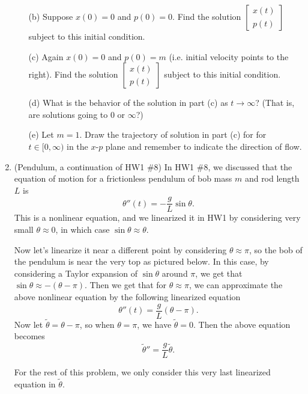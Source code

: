 \documentclass[11pt]{article}
\theoremstyle{definition}
\begin{document}
\begin{enumerate}[leftmargin=*]
\begin{itemize}
\item[(b)] Suppose $x(0)=0$ and $p(0)=0$.  Find the solution $\left[\begin{array}{l} x(t) \\ p(t) \end{array}\right]$ subject to this initial condition.\\

\item[(c)] Again $x(0)=0$ and $p(0)=m$ (i.e. initial velocity points to the right).  Find the solution $\left[\begin{array}{l} x(t) \\ p(t) \end{array}\right]$ subject to this initial condition.  

\item [(d)] What is the behavior of the solution in part (c) as $t\to \infty$?   (That is, are solutions  going to $0$ or $\infty$?)

\item [(e)] Let $m=1$.  Draw the trajectory of solution in part (c) for  for $t\in [0, \infty)$ in the $x$-$p$ plane and remember to indicate the direction of flow.  \\
\end{itemize}

\item (Pendulum, a continuation of HW1 \#8) In HW1 \#8, we discussed  that the equation of motion for a frictionless pendulum of bob mass $m$ and rod length $L$ is 
\[ 
\theta''(t) =-\frac{g}{L}\sin \theta.
\]
This is a nonlinear equation, and we linearized it in HW1 by considering very small $\theta\approx 0$, in which case $\sin\theta\approx \theta$.  

Now let's linearize it near a different point by considering $\theta \approx \pi$, so the bob of the pendulum is near the very top as pictured below.  In this case, by considering a Taylor expansion of $\sin \theta$ around $\pi$, we get that $\sin \theta\approx -(\theta-\pi)$.  Then we get that for $\theta\approx \pi$, we can approximate the above nonlinear equation by the following linearized equation
\[
\theta''(t)=\frac{g}{L} (\theta-\pi).
\]
Now let $\tilde \theta=\theta-\pi$, so when $\theta=\pi$,  we have $\tilde \theta=0$.  Then the above equation becomes 
\[
\tilde \theta'' =\frac{g}{L}\tilde \theta.
\]

For the rest of this problem, we only consider this very last linearized equation in $\tilde \theta$.

\begin{center}
\begin{tikzpicture}[scale=0.9]


\end{tikzpicture}
\end{center}
\end{enumerate}
\end{document}
